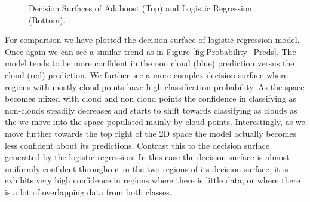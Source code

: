 \documentclass[11pt, letterpaper, journal]{IEEEtran}
\begin{document}
\begin{figure}%
    \centering
    \qquad

    \caption{Decision Surfaces of Adaboost (Top) and Logistic Regression (Bottom). }%
    \label{fig:decision_surface}%
\end{figure}

For comparison we have plotted the decision surface of logistic regression model. Once again we can see a similar trend as in Figure \ref{fig:Probability_Preds}. The model tends to be more confident in the non cloud (blue) prediction versus the cloud (red) prediction. We further see a more complex decision surface where regions with mostly cloud points have high classification probability. As the space becomes mixed with cloud and non cloud points the confidence in classifying as non-clouds steadily decreases and starts to shift towards classifying as clouds as the we move into the space populated mainly by cloud points. Interestingly, as we move further towards the top right of the 2D space the model actually becomes less confident about its predictions. Contrast this to the decision surface generated by the logistic regression. In this case the decision surface is almost uniformly confident throughout in the two regions of its decision surface, it is exhibits very high confidence in regions where there is little data, or where there is a lot of overlapping data from both classes.\\
\end{document}
